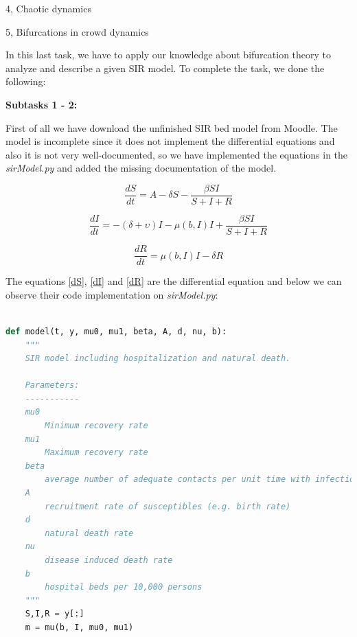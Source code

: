 \documentclass[10pt,a4paper]{article}
\begin{document}
\begin{task}{4, Chaotic dynamics}
\bigskip

\end{task}

\newpage

\begin{task}{5, Bifurcations in crowd dynamics }

In this last task, we have to apply our knowledge about bifurcation theory to analyze and describe a given SIR model. To complete the task, we done the following:

\bigskip

\noindent \textbf{Subtasks 1 - 2:} 

First of all we have download the unfinished SIR bed model from Moodle. The model is incomplete since it does not implement the differential equations and also it is not very well-documented, so we have implemented the equations in the \textit{sirModel.py} and added the missing documentation of the model. 

\begin{equation}\label{dS}
    \frac{dS}{dt} = A - \delta S - \frac{\beta S I}{S + I + R}
\end{equation}

\begin{equation}\label{dI}
    \frac{dI}{dt} = -(\delta + \upsilon)I - \mu(b,I)I + \frac{\beta S I}{S + I + R}
\end{equation}

\begin{equation}\label{dR}
    \frac{dR}{dt} = \mu(b,I)I - \delta R
\end{equation}

The equations \ref{dS}, \ref{dI} and \ref{dR} are the differential equation and below we can observe their code implementation on \textit{sirModel.py}:

\begin{lstlisting}[language = Python, label={decoupling}]

def model(t, y, mu0, mu1, beta, A, d, nu, b):
    """
    SIR model including hospitalization and natural death.
    
    Parameters:
    -----------
    mu0
        Minimum recovery rate
    mu1
        Maximum recovery rate
    beta
        average number of adequate contacts per unit time with infectious individuals
    A
        recruitment rate of susceptibles (e.g. birth rate)
    d
        natural death rate
    nu
        disease induced death rate
    b
        hospital beds per 10,000 persons
    """
    S,I,R = y[:]
    m = mu(b, I, mu0, mu1)
    

\end{lstlisting}
\end{task}
\end{document}
